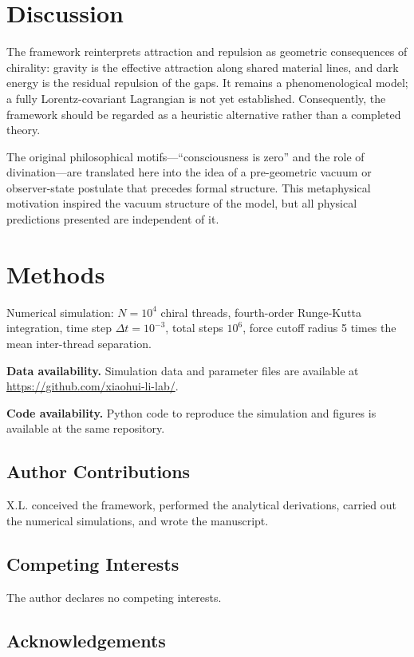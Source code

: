 \documentclass[12pt,a4paper]{article}
\begin{document}
\section*{Discussion}

The framework reinterprets attraction and repulsion as geometric consequences of chirality: gravity is the effective attraction along shared material lines, and dark energy is the residual repulsion of the gaps. It remains a phenomenological model; a fully Lorentz-covariant Lagrangian is not yet established. Consequently, the framework should be regarded as a heuristic alternative rather than a completed theory.

The original philosophical motifs---``consciousness is zero'' and the role of divination---are translated here into the idea of a pre-geometric vacuum or observer-state postulate that precedes formal structure. This metaphysical motivation inspired the vacuum structure of the model, but all physical predictions presented are independent of it.

\section*{Methods}

Numerical simulation: $N=10^4$ chiral threads, fourth-order Runge-Kutta integration, time step $\Delta t=10^{-3}$, total steps $10^6$, force cutoff radius 5 times the mean inter-thread separation.

\noindent\textbf{Data availability.} Simulation data and parameter files are available at \url{https://github.com/xiaohui-li-lab/}.

\noindent\textbf{Code availability.} Python code to reproduce the simulation and figures is available at the same repository.

\subsection*{Author Contributions}

X.L. conceived the framework, performed the analytical derivations, carried out the numerical simulations, and wrote the manuscript.

\subsection*{Competing Interests}

The author declares no competing interests.

\subsection*{Acknowledgements}
\end{document}
